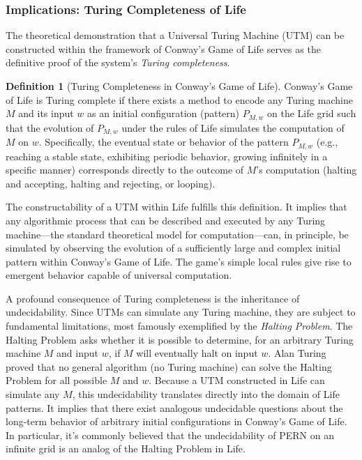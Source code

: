 \documentclass{article}
\theoremstyle{definition}
\newtheorem{definition}{Definition}[section]
\theoremstyle{plain}
\theoremstyle{plain}
\begin{document}
\subsubsection{Implications: Turing Completeness of Life}
The theoretical demonstration that a Universal Turing Machine (UTM) can be constructed within the framework of Conway's Game of Life serves as the definitive proof of the system's \textit{Turing completeness}.

\begin{definition}[Turing Completeness in Conway's Game of Life]
Conway's Game of Life is Turing complete if there exists a method to encode any Turing machine $M$ and its input $w$ as an initial configuration (pattern) $P_{M,w}$ on the Life grid such that the evolution of $P_{M,w}$ under the rules of Life simulates the computation of $M$ on $w$. Specifically, the eventual state or behavior of the pattern $P_{M,w}$ (e.g., reaching a stable state, exhibiting periodic behavior, growing infinitely in a specific manner) corresponds directly to the outcome of $M$'s computation (halting and accepting, halting and rejecting, or looping).
\end{definition}

The constructability of a UTM within Life fulfills this definition. It implies that any algorithmic process that can be described and executed by any Turing machine—the standard theoretical model for computation—can, in principle, be simulated by observing the evolution of a sufficiently large and complex initial pattern within Conway's Game of Life. The game's simple local rules give rise to emergent behavior capable of universal computation.

A profound consequence of Turing completeness is the inheritance of undecidability. Since UTMs can simulate any Turing machine, they are subject to fundamental limitations, most famously exemplified by the \textit{Halting Problem}. The Halting Problem asks whether it is possible to determine, for an arbitrary Turing machine $M$ and input $w$, if $M$ will eventually halt on input $w$. Alan Turing proved that no general algorithm (no Turing machine) can solve the Halting Problem for all possible $M$ and $w$. Because a UTM constructed in Life can simulate any $M$, this undecidability translates directly into the domain of Life patterns. It implies that there exist analogous undecidable questions about the long-term behavior of arbitrary initial configurations in Conway's Game of Life. In particular, it's commonly believed that the undecidability of PERN on an infinite grid is an analog of the Halting Problem in Life.
\end{document}
